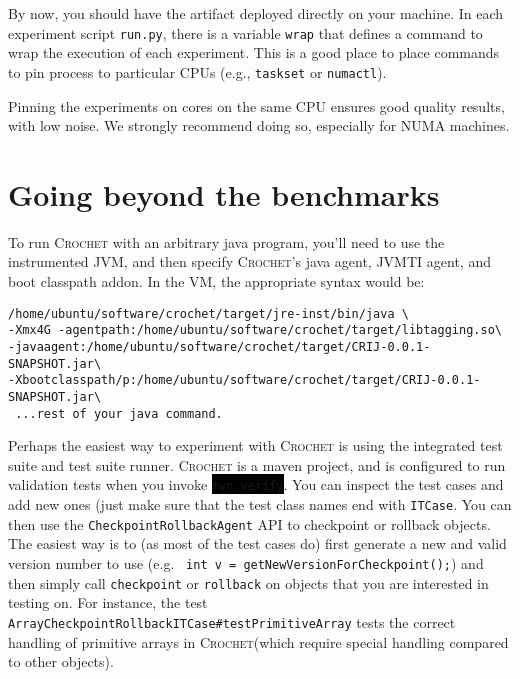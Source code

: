 \documentclass[12pt]{article}
\newcommand{\command}[1]{\colorbox{black}{\texttt{\color{white}#1}}}
\newcommand{\sysname}{\textsc{Crochet}\xspace}
\begin{document}
By now, you should have the artifact deployed directly on your machine.  In each
experiment script \texttt{run.py}, there is a variable \texttt{wrap} that
defines a command to wrap the execution of each experiment.  This is a good
place to place commands to pin process to particular CPUs (e.g.,
\texttt{taskset} or \texttt{numactl}).

Pinning the experiments on cores on the same CPU ensures good quality results,
with low noise.  We strongly recommend doing so, especially for NUMA machines.

\section{Going beyond the benchmarks}
\label{sec:tests}

To run \sysname with an arbitrary java program, you'll need to use the instrumented JVM, and then specify \sysname's java agent, JVMTI agent, and boot classpath addon. In the VM, the appropriate syntax would be:
\begin{verbatim}
/home/ubuntu/software/crochet/target/jre-inst/bin/java \
-Xmx4G -agentpath:/home/ubuntu/software/crochet/target/libtagging.so\
-javaagent:/home/ubuntu/software/crochet/target/CRIJ-0.0.1-SNAPSHOT.jar\
-Xbootclasspath/p:/home/ubuntu/software/crochet/target/CRIJ-0.0.1-SNAPSHOT.jar\
 ...rest of your java command.	
\end{verbatim}
 
 
 Perhaps the easiest way to experiment with \sysname is using the integrated test suite and test suite runner. \sysname is a maven project, and is configured to run validation tests when you invoke \command{mvn verify}. You can inspect the test cases and add new ones (just make sure that the test class names end with \texttt{ITCase}. You can then use the \texttt{CheckpointRollbackAgent} API to checkpoint or rollback objects. The easiest way is to (as most of the test cases do) first generate a new and valid version number to use (e.g. \texttt{		int v = getNewVersionForCheckpoint();}) and then simply call \texttt{checkpoint} or \texttt{rollback} on objects that you are interested in testing on. For instance, the test \texttt{ArrayCheckpointRollbackITCase\#testPrimitiveArray} tests the correct handling of primitive arrays in \sysname (which require special handling compared to other objects).
 
\end{document}

